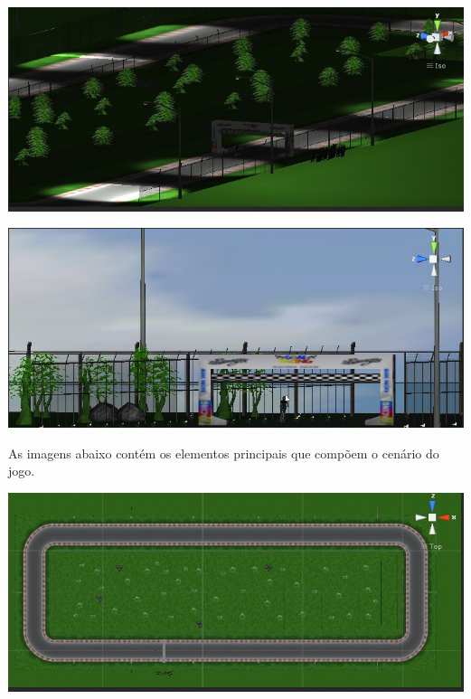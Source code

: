 \begin{center}
	\includegraphics[scale=0.4]{figuras/noturno}
	\label{figura:noturno}
\end{center}

\begin{center}
	\includegraphics[scale=0.4]{figuras/diurno}
	\label{figura:diurno}
\end{center}

As imagens abaixo contém os elementos principais que compõem o cenário do jogo.

\begin{center}
	\includegraphics[scale=0.4]{figuras/pista}
	\label{figura:pista}
\end{center}

